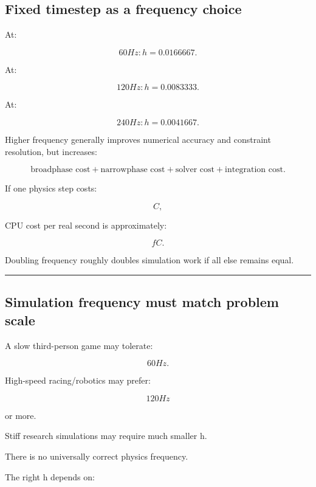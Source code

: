 \subsection{Fixed timestep as a frequency choice}\label{06-engine-ii-ch038-fixed-timestep-as-a-frequency-choice}

\hypertarget{06-engine-ii-ch038-fixed-timestep-as-a-frequency-choice}{}

At:

\[
60Hz:
h=0.0166667.
\]

At:

\[
120Hz:
h=0.0083333.
\]

At:

\[
240Hz:
h=0.0041667.
\]

Higher frequency generally improves numerical accuracy and constraint resolution, but increases:

\[
\text{broadphase cost}
+
\text{narrowphase cost}
+
\text{solver cost}
+
\text{integration cost}.
\]

If one physics step costs:

\[
C,
\]

CPU cost per real second is approximately:

\[
fC.
\]

Doubling frequency roughly doubles simulation work if all else remains equal.

\begin{center}\rule{0.5\linewidth}{0.5pt}\end{center}

\subsection{Simulation frequency must match problem scale}\label{06-engine-ii-ch038-simulation-frequency-must-match-problem-scale}

\hypertarget{06-engine-ii-ch038-simulation-frequency-must-match-problem-scale}{}

A slow third-person game may tolerate:

\[
60Hz.
\]

High-speed racing/robotics may prefer:

\[
120Hz
\]

or more.

Stiff research simulations may require much smaller h.

There is no universally correct physics frequency.

The right h depends on:

